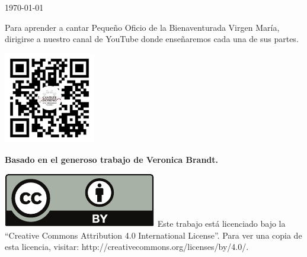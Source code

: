 \documentclass[12pt,a5paper,openright]{memoir}
\begin{document}
\null\vfill
\begin{center}

    \today

    \bigskip
    \bigskip
    \bigskip
    \bigskip

    \footnotesize


    \begin{minipage}{0.6\textwidth}
        \small
        Para aprender a cantar Pequeño Oficio de la Bienaventurada Virgen María, dirigirse a nuestro canal de YouTube donde enseñaremos cada una de sus partes.
    \end{minipage}

    \bigskip
    \bigskip
    \bigskip
    \bigskip

    \includegraphics[width=4cm]{qr_cantate_yt.pdf}

    \bigskip
    \bigskip
    \bigskip
    \bigskip



    \textbf{Basado en el generoso trabajo de Veronica Brandt. }

    \bigskip
    \bigskip

    \begin{minipage}{0.6\textwidth}



        \includegraphics[height=0.8\baselineskip]{by.pdf} Este trabajo está licenciado bajo la ``Creative Commons Attribution 4.0 International License''. Para ver una copia de esta licencia, visitar:
        http://creativecommons.org/licenses/by/4.0/.

    \end{minipage}


\end{center}
\null\vfill
\end{document}
